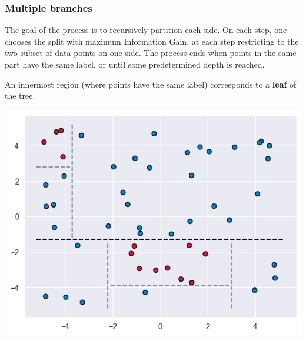 \documentclass[smaller]{beamer}
\theoremstyle{example}
\begin{document}

\begin{frame}
    \frametitle{Multiple branches}
The goal of the process is to recursively partition each side. On each step, one chooses the split with maximum Information Gain, at each step restricting to the two subset of data points on one side. The process ends when points in the same part have the same label, or until some predetermined depth is reached. 

An innermost region (where points have the same label) corresponds to a \textbf{leaf} of the tree.

\centering 
\includegraphics[height=0.35\textheight]{../../Images/decision_tree.png}
\end{frame}


\end{document}
